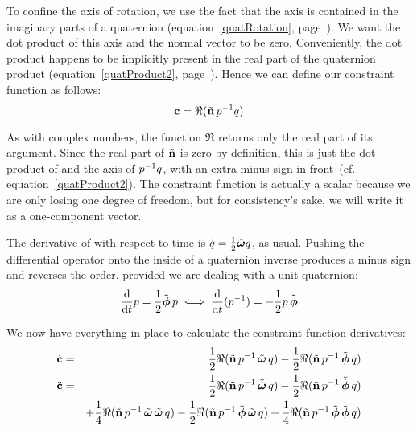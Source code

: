 To confine the axis of rotation, we use the fact that the axis is contained in the imaginary
parts of a quaternion (equation~\ref{quatRotation}, page~\pageref{quatRotation}). We want the dot
product of this axis and the normal vector  to be zero. Conveniently, the dot product
happens to be implicitly present in the real part of the quaternion product
(equation~\ref{quatProduct2}, page~\pageref{quatProduct2}). Hence we can define our constraint
function as follows:
\begin{equation}
\ve{c} = \Re(\tilde{\ve{n}}\, \q{p}^{-1}\q{q})
\end{equation}

As with complex numbers, the function $\Re$ returns only the real part of its argument.
Since the real part of $\tilde{\ve{n}}$ is zero by definition, this is just the dot product of
 and the axis of $\mbox{$p$}^{-1}\mbox{$q$}$, with an extra minus sign in front~(cf.
equation~\ref{quatProduct2}). The constraint function is actually a scalar because we are only
losing one degree of freedom, but for consistency's sake, we will write it as a one-component
vector.

The derivative of  with respect to time is
$\dot{\q{q}} = \frac{1}{2}\tilde{\ve{\omega}}\q{q}$, as usual. Pushing the differential operator
onto the inside of a quaternion inverse produces a minus sign and reverses the order, provided
we are dealing with a unit quaternion:
\begin{equation}
\frac{\diff}{\diff t} \q{p} = \frac{1}{2}\tilde{\ve{\phi}}\,\q{p} \iff
    \frac{\diff}{\diff t} (\q{p}^{-1}) = -\frac{1}{2}\q{p}\,\tilde{\ve{\phi}}
\end{equation}

We now have everything in place to calculate the constraint function derivatives:
\begin{eqnarray}
\dot{\ve{c}} & = & \label{constrJoystickC}
    \frac{1}{2} \Re(\tilde{\ve{n}}\, \q{p}^{-1}\, \tilde{\ve{\omega}}\,\q{q}) -
    \frac{1}{2} \Re(\tilde{\ve{n}}\, \q{p}^{-1}\, \tilde{\ve{\phi}}\, \q{q}) \\
\ddot{\ve{c}} & = & \label{constrJoystickCDot}
    \frac{1}{2} \Re(\tilde{\ve{n}}\, \q{p}^{-1}\, \tilde{\dot{\ve{\omega}}}\,\q{q})
  - \frac{1}{2} \Re(\tilde{\ve{n}}\, \q{p}^{-1}\, \tilde{\dot{\ve{\phi}}}\, \q{q}) \\*
&&+ \frac{1}{4} \Re(\tilde{\ve{n}}\, \q{p}^{-1}\, \tilde{\ve{\omega}}\,\tilde{\ve{\omega}}\, \q{q})
  - \frac{1}{2} \Re(\tilde{\ve{n}}\, \q{p}^{-1}\, \tilde{\ve{\phi}}\,\tilde{\ve{\omega}}\, \q{q})
  + \frac{1}{4} \Re(\tilde{\ve{n}}\, \q{p}^{-1}\, \tilde{\ve{\phi}}\,\tilde{\ve{\phi}}\, \q{q})
    \nonumber
\end{eqnarray}

